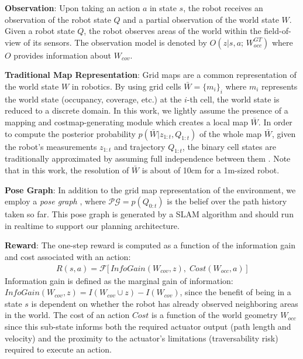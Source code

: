 \documentclass{article}
\newcommand{\ph}[1]{{\textbf{#1}:}} %
\newcommand{\ali}[1]{{\color{blue} #1 }}
\begin{document}
\ph{Observation} Upon taking an action $a$ in state $s$, the robot receives an observation of the robot state $Q$ and a partial observation of the world state $W$. Given a robot state $Q$, the robot observes areas of the world within the field-of-view of its sensors.  The observation model is denoted by $  O(z | s, a; \, W_{occ}^{GT})$
where $O$ provides information about $W_{cov}$.%

\ph{Traditional Map Representation} Grid maps are a common representation of the world state $W$ in robotics. %
By using grid cells $\bar{W}=\{m_i\}_i$ where $m_i$ represents the world state (occupancy, coverage, etc.) at the $i$-th cell, the world state is reduced to a discrete domain.  In this work, we lightly assume the presence of a mapping and costmap-generating module which creates a local map $\bar{W}$.  
In order to compute the posterior probability $p(\bar{W} | z_{1:t}, Q_{1:t})$ of the whole map $\bar{W}$, given the robot's measurements $z_{1:t}$ and trajectory $Q_{1:t}$, the binary cell states are traditionally approximated by assuming full independence between them \cite{TBF05,elfes1990stochastic}. Note that in this work, the resolution of $\bar{W}$ is about of 10cm for a 1m-sized robot.

\ph{Pose Graph} In addition to the grid map representation of the environment, we employ a \textit{pose graph} \cite{thrun2002probabilistic}, where $\mathcal{PG} = p(Q_{0:t})$ is the belief over the path history taken so far.  This pose graph is generated by a SLAM algorithm and should run in realtime to support our planning architecture.  %

\ph{Reward} The one-step reward is computed as a function of the information gain and cost associated with an action:
\begin{align}
    {R}(s, a) = \mathcal{F}\Big[\, \textit{InfoGain}(W_{cov}, z), \; \textit{Cost}(W_{occ}, a) \, \Big]%
\end{align}
Information gain is defined as the marginal gain of information: $\textit{InfoGain}(W_{cov}, z) = I(W_{cov} \cup z) - I(W_{cov})$, since the benefit of being in a state $s$ is dependent on whether the robot has already observed neighboring areas in the world. \ali{The cost of an action $Cost$ is a function of the world geometry $W_{occ}$ since this sub-state informs both the required actuator output (path length and velocity) and the proximity to the actuator's limitations (traversability risk) required to execute an action.}
\end{document}
